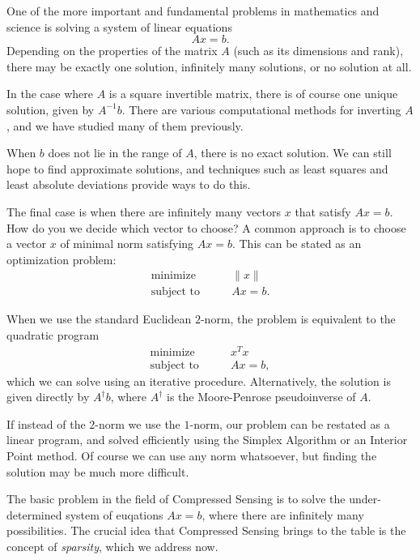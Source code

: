 \label{Ch:CS}



One of the more important and fundamental problems in mathematics and science is solving a system of linear equations
\[
Ax = b.
\]
Depending on the properties of the matrix $A$ (such as its dimensions and rank), there may be exactly one
solution, infinitely many solutions, or no solution at all. 

In the case where $A$ is a square invertible matrix, there is of course one unique solution, given by
$A^{-1}b$. There are various computational methods for inverting $A$, and we have studied many of them previously.

When $b$ does not lie in the range of $A$, there is no exact solution. We can still hope to find approximate solutions,
and techniques such as least squares and least absolute deviations provide ways to do this.

The final case is when there are infinitely many vectors $x$ that satisfy $Ax = b$. How do you we decide which vector
to choose? A common approach is to choose a vector $x$ of minimal norm satisfying $Ax = b$. This can be stated as 
an optimization problem:
\begin{align*}
\text{minimize}\qquad &\|x\|\\
\text{subject to} \qquad &Ax = b.
\end{align*}

When we use the standard Euclidean $2$-norm, the problem is equivalent to the quadratic program
\begin{align*}
\text{minimize}\qquad &x^Tx\\
\text{subject to} \qquad &Ax = b,
\end{align*}
which we can solve using an iterative procedure. Alternatively, the solution is given directly by $A^\dagger b$,
where $A^\dagger$ is the Moore-Penrose pseudoinverse of $A$. 

If instead of the $2$-norm we use the $1$-norm, our problem can be restated as a linear program, and solved
efficiently using the Simplex Algorithm or an Interior Point method. Of course we can use any norm whatsoever, but
finding the solution may be much more difficult.

The basic problem in the field of Compressed Sensing is to solve the under-determined system of euqations
$Ax = b$, where there are infinitely many possibilities. The crucial idea that Compressed Sensing brings
to the table is the concept of \emph{sparsity}, which we address now.

